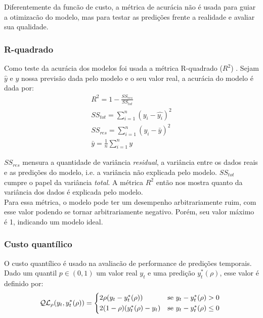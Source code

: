 Diferentemente da funcão de custo, a métrica de acurácia não é usada para guiar a otimizacão do modelo,
mas para testar as predições frente a realidade e avaliar sua qualidade. \\

\subsubsection{R-quadrado}
Como teste da acurácia dos modelos foi usada a métrica R-quadrado ($R^2$) \citep{cohen}. Sejam $\hat{y}$ e $y$ nossa previsão dada pelo modelo e o seu valor real, a acurácia do modelo é dada por:\\

\begin{align}
&R^2 = 1 - \frac{SS_{res}}{SS_{tot}} &\\
&SS_{tot} = \sum^n_{i=1} (y_i- \hat{y_i})^2 &\\
&SS_{res} = \sum^n_{i=1} (y_i - \bar{y})^2 &\\
&\bar{y} = \frac{1}{n} \sum^n_{i=1} y &
\end{align}

$SS_{res}$ mensura a quantidade de variância \textit{residual}, a
variância entre os dados reais e as predições do modelo, i.e. a variância não
explicada pelo modelo. $SS_{tot}$ cumpre o papel da variância \textit{total}. A métrica $R^2$
então nos mostra quanto da variância dos dados é explicada pelo modelo. \\

Para essa métrica, o modelo pode ter um desempenho arbitrariamente ruim, com esse valor
podendo se tornar arbitrariamente negativo. Porém, seu valor máximo é 1,
indicando um modelo ideal.\\


\subsubsection{Custo quantílico}

O custo quantílico é usado na avaliacão de performance de predições temporais. \\
Dado um quantil $p \in (0,1)$ um valor real $y_{t}$ e uma predição $y^{*}_{t}(\rho)$, esse valor é definido por: \\

\begin{equation}
  \mathcal{QL}_{\rho}(y_{t},y^{*}_{t}(\rho)) =
\begin{cases*}
  2 \rho(y_{t} - y^{*}_{t}(\rho)) & se $ y_{t} - y^{*}_{t}(\rho) > 0$ \\
  2 (1 - \rho)(y^{*}_{t}(\rho) - y_{t}) & se $y_{t} - y^{*}_{t}(\rho) \leq 0$
\end{cases*}
\end{equation}




